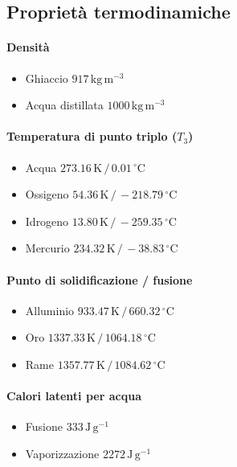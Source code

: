 \documentclass[10pt, oneside]{book}
\begin{document}
\subsection*{Proprietà termodinamiche}
\paragraph{Densità}
\begin{itemize}
\item Ghiaccio \dotfill $ 917 \, \mathrm{kg \, m^{-3}}$
\item Acqua distillata \dotfill $ 1000 \, \mathrm{kg \, m^{-3}}$
\end{itemize}
\paragraph{Temperatura di punto triplo ($T_3$)}
\begin{itemize}
\item Acqua \dotfill $273.16 \, \mathrm{K} \, \big/ \, 0.01 \, \mathrm{{}^{\circ} C}$
\item Ossigeno \dotfill $54.36 \, \mathrm{K} \, \big/ \, -218.79 \, \mathrm{{}^{\circ} C}$
\item Idrogeno \dotfill $13.80 \, \mathrm{K} \, \big/ \, -259.35 \, \mathrm{{}^{\circ} C}$
\item Mercurio \hfill $234.32 \, \mathrm{K} \, \big/ \, -38.83 \, \mathrm{{}^{\circ} C}$
\end{itemize}
\paragraph{Punto di solidificazione / fusione}
\begin{itemize}
\item Alluminio \dotfill $933.47 \, \mathrm{K} \, \big/ \, 660.32 \, \mathrm{{}^{\circ} C}$
\item Oro \dotfill $1337.33 \, \mathrm{K} \, \big/ \, 1064.18 \, \mathrm{{}^{\circ} C}$
\item Rame \dotfill $1357.77 \, \mathrm{K} \, \big/ \, 1084.62 \, \mathrm{{}^{\circ} C}$
\end{itemize}
\paragraph{Calori latenti per acqua}
\begin{itemize}
\item Fusione \dotfill $ 333 \, \mathrm{J \, g^{-1}}$
\item Vaporizzazione \dotfill $ 2272 \, \mathrm{J \, g^{-1}}$
\end{itemize}
\end{document}
